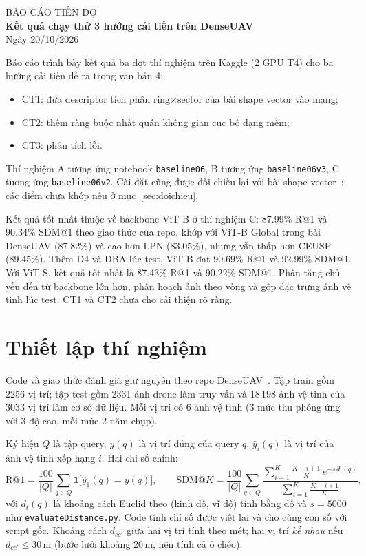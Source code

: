 \documentclass[11pt,a4paper]{article}
\begin{document}
\begin{center}
{\large BÁO CÁO TIẾN ĐỘ}\\[3pt]
{\Large\bfseries Kết quả chạy thử 3 hướng cải tiến trên DenseUAV}\\[5pt]
Ngày 20/10/2026
\end{center}

Báo cáo trình bày kết quả ba đợt thí nghiệm trên Kaggle (2 GPU T4) cho ba hướng cải tiến đề ra trong văn bản 4:
\begin{itemize}
\item CT1: đưa descriptor tích phân ring$\times$sector của bài shape vector vào mạng;
\item CT2: thêm ràng buộc nhất quán không gian cục bộ dạng mềm;
\item CT3: phân tích lỗi.
\end{itemize}
Thí nghiệm A tương ứng notebook \texttt{baseline06}, B tương ứng \texttt{baseline06v3}, C tương ứng \texttt{baseline06v2}. Cài đặt cũng được đối chiếu lại với bài shape vector~\cite{huu2026}; các điểm chưa khớp nêu ở mục~\ref{sec:doichieu}.

Kết quả tốt nhất thuộc về backbone ViT-B ở thí nghiệm C: 87.99\% R@1 và 90.34\% SDM@1 theo giao thức của repo, khớp với ViT-B Global trong bài DenseUAV (87.82\%) và cao hơn LPN (83.05\%), nhưng vẫn thấp hơn CEUSP (89.45\%). Thêm D4 và DBA lúc test, ViT-B đạt 90.69\% R@1 và 92.99\% SDM@1. Với ViT-S, kết quả tốt nhất là 87.43\% R@1 và 90.22\% SDM@1. Phần tăng chủ yếu đến từ backbone lớn hơn, phân hoạch ảnh theo vòng và gộp đặc trưng ảnh vệ tinh lúc test. CT1 và CT2 chưa cho cải thiện rõ ràng.

\section{Thiết lập thí nghiệm}
Code và giao thức đánh giá giữ nguyên theo repo DenseUAV~\cite{dai2024}. Tập train gồm 2256 vị trí; tập test gồm 2331 ảnh drone làm truy vấn và 18\,198 ảnh vệ tinh của 3033 vị trí làm cơ sở dữ liệu. Mỗi vị trí có 6 ảnh vệ tinh (3 mức thu phóng ứng với 3 độ cao, mỗi mức 2 năm chụp).

Ký hiệu $Q$ là tập query, $y(q)$ là vị trí đúng của query $q$, $\hat y_i(q)$ là vị trí của ảnh vệ tinh xếp hạng $i$. Hai chỉ số chính:
\[
\mathrm{R@}1=\frac{100}{|Q|}\sum_{q\in Q}\mathbf 1\big[\hat y_1(q)=y(q)\big],\qquad
\mathrm{SDM@}K=\frac{100}{|Q|}\sum_{q\in Q}\frac{\sum_{i=1}^{K}\frac{K-i+1}{K}\,e^{-s\,d_i(q)}}{\sum_{i=1}^{K}\frac{K-i+1}{K}},
\]
với $d_i(q)$ là khoảng cách Euclid theo (kinh độ, vĩ độ) tính bằng độ và $s=5000$ như \texttt{evaluateDistance.py}. Code tính chỉ số được viết lại và cho cùng con số với script gốc. Khoảng cách $d_{cc'}$ giữa hai vị trí tính theo mét; hai vị trí \emph{kề nhau} nếu $d_{cc'}\le30$\,m (bước lưới khoảng 20\,m, nên tính cả ô chéo).
\end{document}
